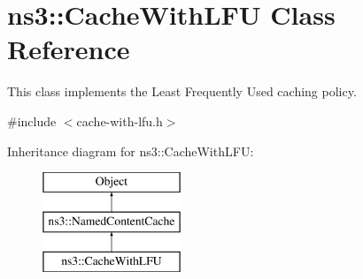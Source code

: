 \hypertarget{classns3_1_1CacheWithLFU}{\section{ns3\-:\-:Cache\-With\-L\-F\-U Class Reference}
\label{classns3_1_1CacheWithLFU}
}


This class implements the Least Frequently Used caching policy.  




{\ttfamily \#include $<$cache-\/with-\/lfu.\-h$>$}

Inheritance diagram for ns3\-:\-:Cache\-With\-L\-F\-U\-:\begin{figure}[H]
\begin{center}
\leavevmode
\includegraphics[height=3.000000cm]{classns3_1_1CacheWithLFU}
\end{center}
\end{figure}
